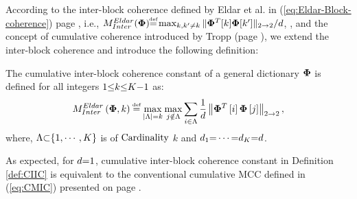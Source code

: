 According to the inter-block coherence defined by Eldar et al. in (\ref{eq:Eldar-Block-coherence}) page \pageref{eq:Eldar-Block-coherence}, i.e., $M^{Eldar}_{Inter}(\myPhi) {\myeq} \max_{k,k' \neq k} \Vert\myPhi ^T [k] \myPhi [k']\Vert_{2 \to 2}/d$,  \cite{Eldar2009b,Eldar2010b,Eldar2010}, and the concept of cumulative coherence introduced by Tropp \cite{Tropp2004} (page \pageref{txt:CMCC-properties}), we extend the inter-block coherence and introduce the following definition:
\begin{Mydefinition}
\label{def:CIIC}
\leftbar
The cumulative inter-block coherence constant of a general dictionary $\boldsymbol{\Phi}$ is defined for all integers $1 {\leq} k {\leq} K {-} 1$ as:
\begin{equation*}
M_{Inter}^{Eldar}\myparanthese{\myPhi , k} \myeq
\max_{\myabs{\Lambda}=k} \max_{j \notin \Lambda} \sum_{i \in \Lambda} \frac{1}{d} \mynorm{\myPhi^T\mybracket{i} \myPhi\mybracket{j}}_{2 \to 2},
\end{equation*}
where, $\Lambda {\subset} \{1, \cdots, K\}$ is of $\mathrm{Cardinality}$ $k$ and $d_1 {=} \cdots {=} d_K {=} d$.
\endleftbar
\end{Mydefinition}

As expected, for $d {=} 1$, cumulative inter-block coherence constant in Definition \ref{def:CIIC} is equivalent to the conventional cumulative MCC defined in (\ref{eq:CMIC}) presented on page \pageref{eq:CMIC}.
